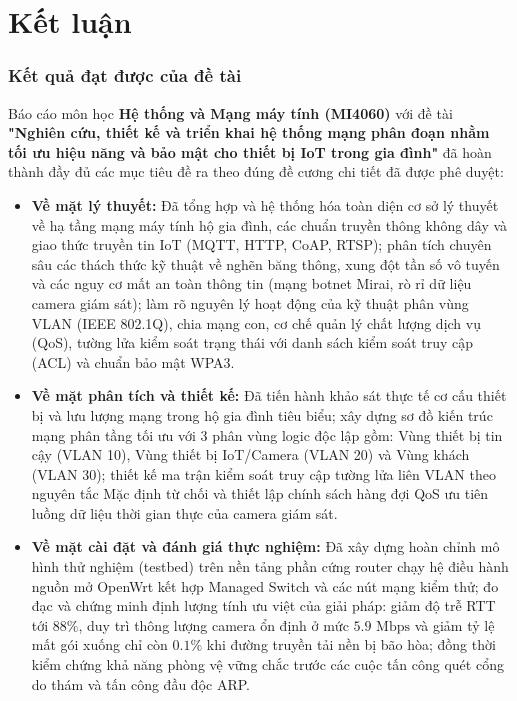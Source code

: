 \chapter*{Kết luận}
\setcounter{section}{0}
\renewcommand*{\thesection}{\the\value{section}}

\subsection*{Kết quả đạt được của đề tài} 

Báo cáo môn học \textbf{Hệ thống và Mạng máy tính (MI4060)} với đề tài \textbf{"Nghiên cứu, thiết kế và triển khai hệ thống mạng phân đoạn nhằm tối ưu hiệu năng và bảo mật cho thiết bị IoT trong gia đình"} đã hoàn thành đầy đủ các mục tiêu đề ra theo đúng đề cương chi tiết đã được phê duyệt:
\begin{itemize}
    \item \textbf{Về mặt lý thuyết:} Đã tổng hợp và hệ thống hóa toàn diện cơ sở lý thuyết về hạ tầng mạng máy tính hộ gia đình, các chuẩn truyền thông không dây và giao thức truyền tin IoT (MQTT, HTTP, CoAP, RTSP); phân tích chuyên sâu các thách thức kỹ thuật về nghẽn băng thông, xung đột tần số vô tuyến và các nguy cơ mất an toàn thông tin (mạng botnet Mirai, rò rỉ dữ liệu camera giám sát); làm rõ nguyên lý hoạt động của kỹ thuật phân vùng VLAN (IEEE 802.1Q), chia mạng con, cơ chế quản lý chất lượng dịch vụ (QoS), tường lửa kiểm soát trạng thái với danh sách kiểm soát truy cập (ACL) và chuẩn bảo mật WPA3.
    \item \textbf{Về mặt phân tích và thiết kế:} Đã tiến hành khảo sát thực tế cơ cấu thiết bị và lưu lượng mạng trong hộ gia đình tiêu biểu; xây dựng sơ đồ kiến trúc mạng phân tầng tối ưu với 3 phân vùng logic độc lập gồm: Vùng thiết bị tin cậy (VLAN 10), Vùng thiết bị IoT/Camera (VLAN 20) và Vùng khách (VLAN 30); thiết kế ma trận kiểm soát truy cập tường lửa liên VLAN theo nguyên tắc Mặc định từ chối và thiết lập chính sách hàng đợi QoS ưu tiên luồng dữ liệu thời gian thực của camera giám sát.
    \item \textbf{Về mặt cài đặt và đánh giá thực nghiệm:} Đã xây dựng hoàn chỉnh mô hình thử nghiệm (testbed) trên nền tảng phần cứng router chạy hệ điều hành nguồn mở OpenWrt kết hợp Managed Switch và các nút mạng kiểm thử; đo đạc và chứng minh định lượng tính ưu việt của giải pháp: giảm độ trễ RTT tới $88\%$, duy trì thông lượng camera ổn định ở mức $5.9\text{ Mbps}$ và giảm tỷ lệ mất gói xuống chỉ còn $0.1\%$ khi đường truyền tải nền bị bão hòa; đồng thời kiểm chứng khả năng phòng vệ vững chắc trước các cuộc tấn công quét cổng do thám và tấn công đầu độc ARP.
\end{itemize}

